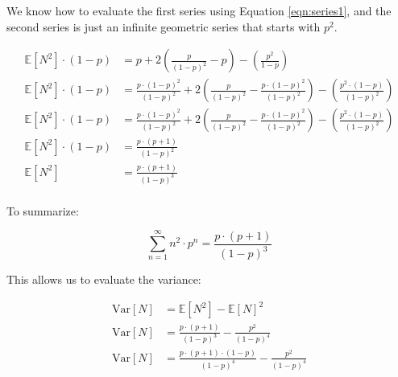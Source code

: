We know how to evaluate the first series using Equation \ref{eqn:series1}, 
and the second series is just an infinite geometric series that starts with $p^2$.

\begin{align}
  \mathbb{E}[N^2] \cdot (1 - p) &= p + 2\left(\frac{p}{(1-p)^2} - p\right) - \left(\frac{p^2}{1-p}\right) \\ 
  \mathbb{E}[N^2] \cdot (1 - p) &= \frac{p\cdot\left(1-p\right)^2}{\left(1-p\right)^2} + 2\left(\frac{p}{(1-p)^2} - \frac{p\cdot\left(1-p\right)^2}{\left(1-p\right)^2}\right) - \left(\frac{p^2\cdot\left(1-p\right)}{\left(1-p\right)^2}\right) \\ 
  \mathbb{E}[N^2] \cdot (1 - p) &= \frac{p\cdot\left(1-p\right)^2}{\left(1-p\right)^2} + 2\left(\frac{p}{(1-p)^2} - \frac{p\cdot\left(1-p\right)^2}{\left(1-p\right)^2}\right) - \left(\frac{p^2\cdot\left(1-p\right)}{\left(1-p\right)^2}\right) \\ 
  \mathbb{E}[N^2] \cdot (1 - p) &= \frac{p\cdot(p+1)}{\left(1-p\right)^2} \\
  \mathbb{E}[N^2] &= \frac{p\cdot(p+1)}{\left(1-p\right)^3} \\
\end{align}


To summarize:

\begin{equation}
  \label{eqn:series2}
  \boxed{
    \sum_{n=1}^{\infty} n^2 \cdot p^{n} = \frac{p\cdot(p+1)}{\left(1-p\right)^3}
  }
\end{equation}

This allows us to evaluate the variance:

\begin{align}
  \text{Var}[N] &= \mathbb{E}[N^2] - \mathbb{E}[N]^2 \\ 
  \text{Var}[N] &= \frac{p\cdot(p+1)}{\left(1-p\right)^3} - \frac{p^2}{(1-p)^4} \\
  \text{Var}[N] &= \frac{p\cdot(p+1)\cdot(1-p)}{\left(1-p\right)^4} - \frac{p^2}{(1-p)^4} \\
\end{align}

